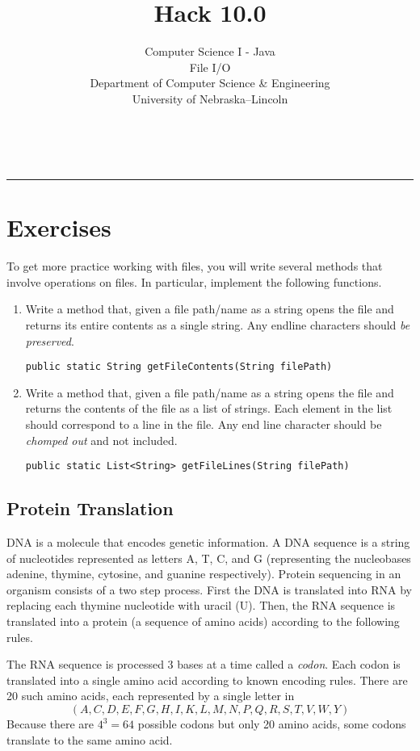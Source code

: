 \documentclass[12pt]{scrartcl}
\title{Hack 10.0}\let\Title\@title
\subtitle{Computer Science I - Java\\
File I/O\\
{\small
\vskip1cm
Department of Computer Science \& Engineering \\
University of Nebraska--Lincoln}
\vskip-2cm}
\date{~}
\begin{document}
\maketitle

\hrule



\section*{Exercises}

To get more practice working with files, you will write several 
methods that involve operations on files.  In particular, implement
the following functions.

\begin{enumerate}

  \item Write a method that, given a file path/name as a string opens
  the file and returns its entire contents as a single string.  Any endline
  characters should \emph{be preserved}.
  
  \texttt{public static String getFileContents(String filePath)}

  \item Write a method that, given a file path/name as a string opens
  the file and returns the contents of the file as a list of strings.
  Each element in the list should correspond to a line in the file.
  Any end line character should be \emph{chomped out} and not included.

  \texttt{public static List<String> getFileLines(String filePath)}

\end{enumerate}

\subsection*{Protein Translation}

DNA is a molecule that encodes genetic information.  A DNA sequence is 
a string of nucleotides represented as letters A, T, C, and G (representing
the nucleobases adenine, thymine, cytosine, and guanine respectively).  
Protein sequencing in an organism consists of a two step process.  First 
the DNA is translated into RNA by replacing each thymine nucleotide with 
uracil (U).  Then, the RNA sequence is translated into a protein (a sequence
of amino acids) according to the following rules.

The RNA sequence is processed 3 bases at a time called a \emph{codon}.  
Each codon is translated into a single amino acid according to known 
encoding rules.  There are 20 such amino acids, each represented by a 
single letter in 
 $$(A,C,D,E,F,G,H,I,K,L,M,N,P,Q,R,S,T,V,W,Y)$$
Because there are $4^3 = 64$ possible codons but only 20 amino acids,
some codons translate to the same amino acid.
\end{document}
